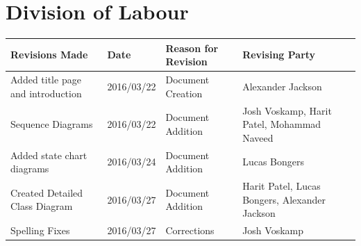 \documentclass[]{article}
\begin{document}


\newpage
\section*{Division of Labour}
\label{sec:division_of_labour}
\begin{table}[H]
	\centering
	\begin{tabular}{|p{5cm}|p{2cm}|p{3.5cm}|p{3cm}|}\hline
	    \textbf{Revisions Made} & \textbf{Date} & \textbf{Reason for Revision} & \textbf{Revising Party}\\\hline
		Added title page and introduction & 2016/03/22 & Document Creation & Alexander Jackson\\\hline
		Sequence Diagrams & 2016/03/22 & Document Addition & Josh Voskamp, Harit Patel, Mohammad Naveed\\\hline
		Added state chart diagrams & 2016/03/24 & Document Addition & Lucas Bongers\\\hline
		Created Detailed Class Diagram & 2016/03/27 & Document Addition & Harit Patel, Lucas Bongers, Alexander Jackson\\\hline
		Spelling Fixes & 2016/03/27 & Corrections & Josh Voskamp\\\hline
	\end{tabular}
\end{table}
\vspace{3cm}
\end{document}

